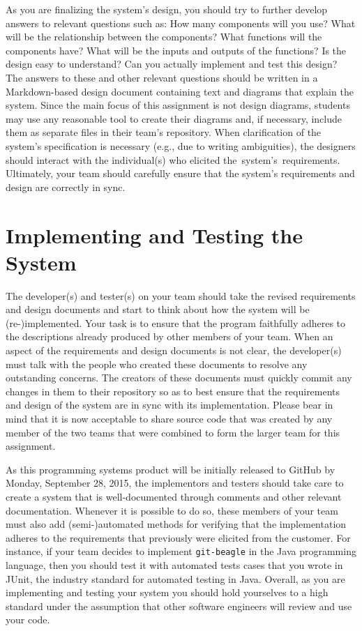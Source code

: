 As you are finalizing the system's design, you should try to further develop answers to relevant questions such as: How
many components will you use? What will be the relationship between the components? What functions will the components
have?  What will be the inputs and outputs of the functions?  Is the design easy to understand?  Can you actually
implement and test this design? The answers to these and other relevant questions should be written in a Markdown-based
design document containing text and diagrams that explain the system. Since the main focus of this assignment is not
design diagrams, students may use any reasonable tool to create their diagrams and, if necessary, include them as
separate files in their team's repository.  When clarification of the system's specification is necessary (e.g., due to
writing ambiguities), the designers should interact with the individual(s) who elicited \mbox{the system's
requirements}.  Ultimately, your team should carefully ensure that the system's requirements and design are correctly in
sync.

\section*{Implementing and Testing the System}

The developer(s) and tester(s) on your team should take the revised requirements and design documents and start to think
about how the system will be (re-)implemented. Your task is to ensure that the program faithfully adheres to the descriptions
already produced by other members of your team. When an aspect of the requirements and design documents is not clear,
the developer(s) must talk with the people who created these documents to resolve any outstanding concerns. The creators
of these documents must quickly commit any changes in them to their repository so as to best ensure that the
requirements and design of the system are in sync with its implementation. Please bear in mind that it is now acceptable
to share source code that was created by any member of the two teams that were combined to form the larger team for this
assignment.

As this programming systems product will be initially released to GitHub by Monday, September 28, 2015, the implementors
and testers should take care to create a system that is well-documented through comments and other relevant
documentation. Whenever it is possible to do so, these members of your team must also add (semi-)automated methods for
verifying that the implementation adheres to the requirements that previously were elicited from the customer. For
instance, if your team decides to implement {\tt git-beagle} in the Java programming language, then you should test it
with automated tests cases that you wrote in JUnit, the industry standard for automated testing in Java. Overall, as you
are implementing and testing your system you should hold yourselves to a high standard under the assumption that other
software engineers will review and use your code.

